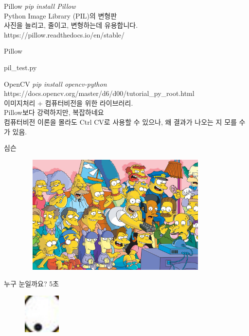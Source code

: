 \documentclass{beamer}
\begin{document}
\begin{frame}{Pillow}
\textit{pip install Pillow}\\
Python Image Library (PIL)의 변형판\\
사진을 늘리고, 줄이고, 변형하는데 유용합니다.\\
https://pillow.readthedocs.io/en/stable/
\end{frame}

\begin{frame}{Pillow}
  \begin{lstinputlisting}
    {pil_test.py}
  \end{lstinputlisting}
\end{frame}

\begin{frame}{OpenCV}
\textit{pip install opencv-python}\\
https://docs.opencv.org/master/d6/d00/tutorial_py_root.html\\
이미지처리 + 컴퓨터비전을 위한 라이브러리.\\
Pillow보다 강력하지만, 복잡하네요\\
컴퓨터비전 이론을 몰라도 Ctrl CV로 사용할 수 있으나, 왜 결과가 나오는 지 모를 수가 있음.
\end{frame}

\begin{frame}{심슨}
\begin{figure}[H]
  \centering
  \includegraphics[width=100mm,height=60mm]{simpsons.jpeg}
\end{figure}
\end{frame}

\begin{frame}{누구 눈일까요? 5초}
\begin{figure}[H]
  \centering
  \includegraphics[width=20mm,height=20mm]{eyes3.jpeg}
\end{figure}
\end{frame}
\end{document}
